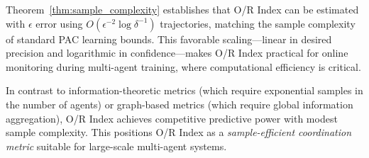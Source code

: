 Theorem~\ref{thm:sample_complexity} establishes that O/R Index can be estimated with $\epsilon$ error using $O(\epsilon^{-2} \log \delta^{-1})$ trajectories, matching the sample complexity of standard PAC learning bounds. This favorable scaling—linear in desired precision and logarithmic in confidence—makes O/R Index practical for online monitoring during multi-agent training, where computational efficiency is critical.

In contrast to information-theoretic metrics (which require exponential samples in the number of agents) or graph-based metrics (which require global information aggregation), O/R Index achieves competitive predictive power with modest sample complexity. This positions O/R Index as a \textit{sample-efficient coordination metric} suitable for large-scale multi-agent systems.
